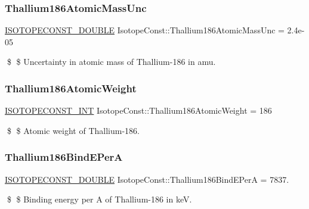 \subsubsection{\texorpdfstring{Thallium186\+Atomic\+Mass\+Unc}{Thallium186AtomicMassUnc}}
{\footnotesize\ttfamily \mbox{\hyperlink{group___isotope_const-_macros_ga8f45a7272ce02c0b4c65c44636ed719a}{I\+S\+O\+T\+O\+P\+E\+C\+O\+N\+S\+T\+\_\+\+D\+O\+U\+B\+LE}} Isotope\+Const\+::\+Thallium186\+Atomic\+Mass\+Unc = 2.\+4e-\/05}

\$ \$ Uncertainty in atomic mass of Thallium-\/186 in amu. \mbox{\label{group___isotope_const-_thallium-_tl186_ga3efc1734d2ae6acbe51c147bb81b8708}} 
\subsubsection{\texorpdfstring{Thallium186\+Atomic\+Weight}{Thallium186AtomicWeight}}
{\footnotesize\ttfamily \mbox{\hyperlink{group___isotope_const-_macros_ga5f18360b3e99483a35c32d789e62621c}{I\+S\+O\+T\+O\+P\+E\+C\+O\+N\+S\+T\+\_\+\+I\+NT}} Isotope\+Const\+::\+Thallium186\+Atomic\+Weight = 186}

\$ \$ Atomic weight of Thallium-\/186. \mbox{\label{group___isotope_const-_thallium-_tl186_gad47740b38747a1257e2520d19a553caa}} 
\subsubsection{\texorpdfstring{Thallium186\+Bind\+E\+PerA}{Thallium186BindEPerA}}
{\footnotesize\ttfamily \mbox{\hyperlink{group___isotope_const-_macros_ga8f45a7272ce02c0b4c65c44636ed719a}{I\+S\+O\+T\+O\+P\+E\+C\+O\+N\+S\+T\+\_\+\+D\+O\+U\+B\+LE}} Isotope\+Const\+::\+Thallium186\+Bind\+E\+PerA = 7837.}

\$ \$ Binding energy per A of Thallium-\/186 in keV. \mbox{\label{group___isotope_const-_thallium-_tl186_gab96d9d900ce1f6f6531a72802ccdfbc6}} 
